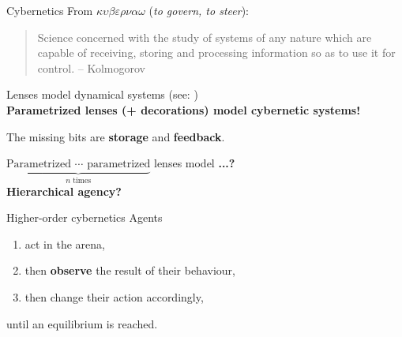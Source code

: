 \begin{frame}{Cybernetics}
	From $\kappa\upsilon\beta\varepsilon\rho\nu\alpha\omega$ (\emph{to govern, to steer}):
	\vfill

	\begin{quotation}
		Science concerned with the study of systems of any nature which are capable of receiving, storing and processing information so as to use it for control.
		{\color{colornote}-- Kolmogorov}
	\end{quotation}

	Lenses model dynamical systems (see: \cite{myers2020double})\\
	\textbf{\color{coloraccent}Parametrized lenses (+ decorations) model cybernetic systems!}

	\vfill
	The missing bits are \textbf{storage} and \textbf{feedback}.

	\vfill
	{\color{colornote}
	$\underbrace{\text{Parametrized $\cdots$ parametrized}}_{\text{$n$ times}}$ lenses model \textbf{...?}\\[1.5ex]
		\hspace{5ex} \textbf{Hierarchical agency?}
	}
\end{frame}

\begin{frame}{Higher-order cybernetics}
	Agents
	\begin{enumerate}
		\item act in the arena,
		\item then \textbf<2->{observe} the result of their behaviour,
		\item then change their action accordingly,
	\end{enumerate}
	until an equilibrium is reached.

\end{frame}

